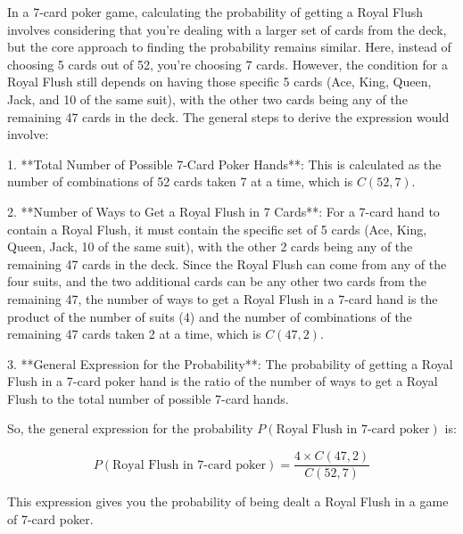 In a 7-card poker game, calculating the probability of getting a Royal Flush involves considering that you're dealing with a larger set of cards from the deck, but the core approach to finding the probability remains similar. Here, instead of choosing 5 cards out of 52, you're choosing 7 cards. However, the condition for a Royal Flush still depends on having those specific 5 cards (Ace, King, Queen, Jack, and 10 of the same suit), with the other two cards being any of the remaining 47 cards in the deck. The general steps to derive the expression would involve:

1. **Total Number of Possible 7-Card Poker Hands**: This is calculated as the number of combinations of 52 cards taken 7 at a time, which is \(C(52, 7)\).

2. **Number of Ways to Get a Royal Flush in 7 Cards**: For a 7-card hand to contain a Royal Flush, it must contain the specific set of 5 cards (Ace, King, Queen, Jack, 10 of the same suit), with the other 2 cards being any of the remaining 47 cards in the deck. Since the Royal Flush can come from any of the four suits, and the two additional cards can be any other two cards from the remaining 47, the number of ways to get a Royal Flush in a 7-card hand is the product of the number of suits (4) and the number of combinations of the remaining 47 cards taken 2 at a time, which is \(C(47, 2)\).

3. **General Expression for the Probability**: The probability of getting a Royal Flush in a 7-card poker hand is the ratio of the number of ways to get a Royal Flush to the total number of possible 7-card hands. 

So, the general expression for the probability \(P(\text{Royal Flush in 7-card poker})\) is:

\[
P(\text{Royal Flush in 7-card poker}) = \frac{4 \times C(47, 2)}{C(52, 7)}
\]

This expression gives you the probability of being dealt a Royal Flush in a game of 7-card poker.